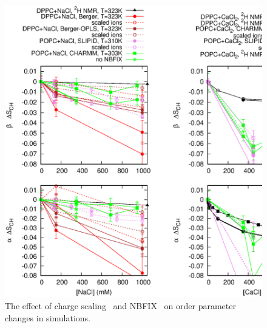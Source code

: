 \documentclass[pre,aps,floatfix,authordate1-4,twocolumn]{revtex4-1}
\begin{document}

\begin{figure}[]
  \centering
  \includegraphics[width=16cm]{../Fig/OrderParameterIONSchangesSCALED.eps} 
  \caption{\label{OPchangesSCALED}
    The effect of charge scaling~\cite{leontyev11,kohagen14} and NBFIX~\cite{venable13} on order parameter changes in simulations. 
    }
\end{figure}
\end{document}
